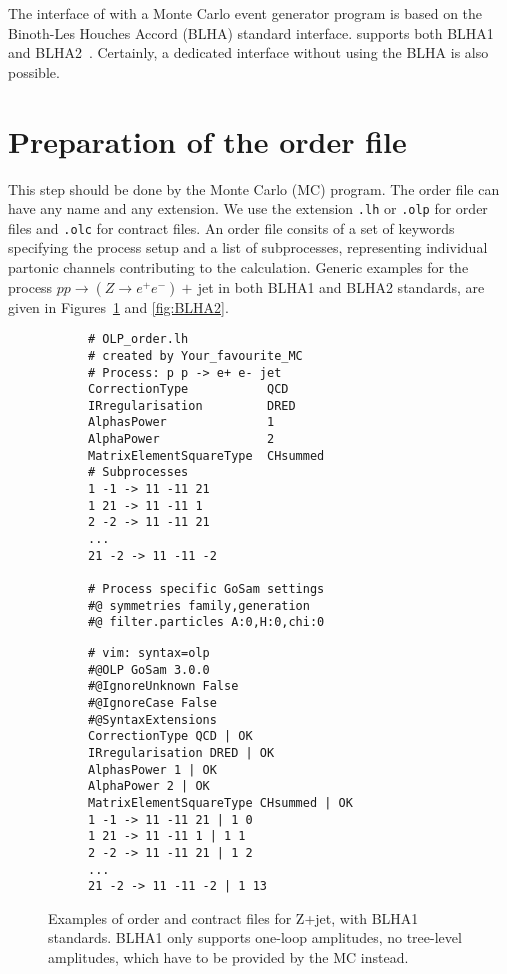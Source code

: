 The interface of \gosam with a Monte Carlo event generator program is based on the Binoth-Les Houches Accord (BLHA) standard interface. \gosamv  supports both BLHA1~\cite{Binoth:2010xt} and BLHA2~\cite{Alioli:2013nda}. Certainly, a dedicated interface without using the BLHA is also possible.

%
%
%
%

\section{Preparation of the order file}
This step should be done by the Monte Carlo (MC) program. The order file can have any name and any extension. We use  the extension \texttt{.lh} or \texttt{.olp} for order files and \texttt{.olc} for contract files. An order file consits of a set of keywords specifying the process setup and a list of subprocesses, representing individual partonic channels contributing to the calculation. Generic examples for the process $pp\to (Z\to e^+e^-)+$\,jet in both BLHA1 and BLHA2 standards, are given in Figures~\ref{fig:BLHA1} and \ref{fig:BLHA2}.

\begin{figure}
\centering
\begin{subfigure}[]{0.49\textwidth}
\centering
\begin{lstlisting}[title={BLHA1 order file},gobble=0,style=insmall,keepspaces=true,frame=single]
# OLP_order.lh
# created by Your_favourite_MC
# Process: p p -> e+ e- jet
CorrectionType           QCD
IRregularisation         DRED
AlphasPower              1
AlphaPower               2
MatrixElementSquareType  CHsummed
# Subprocesses
1 -1 -> 11 -11 21
1 21 -> 11 -11 1
2 -2 -> 11 -11 21
...
21 -2 -> 11 -11 -2

# Process specific GoSam settings
#@ symmetries family,generation
#@ filter.particles A:0,H:0,chi:0
\end{lstlisting}
\end{subfigure}
\hspace*{5pt}
\begin{subfigure}[]{0.46\textwidth}
\centering
\begin{lstlisting}[title={BLHA1 contract file},gobble=0,style=insmall,keepspaces=true,frame=single]
# vim: syntax=olp
#@OLP GoSam 3.0.0
#@IgnoreUnknown False
#@IgnoreCase False
#@SyntaxExtensions
CorrectionType QCD | OK
IRregularisation DRED | OK
AlphasPower 1 | OK
AlphaPower 2 | OK
MatrixElementSquareType CHsummed | OK
1 -1 -> 11 -11 21 | 1 0
1 21 -> 11 -11 1 | 1 1
2 -2 -> 11 -11 21 | 1 2
...
21 -2 -> 11 -11 -2 | 1 13
\end{lstlisting}
\end{subfigure}
\caption{Examples of order and contract files for Z+jet, with BLHA1 standards. BLHA1 only supports one-loop amplitudes, no tree-level amplitudes, which have to be provided by the MC instead.}
\label{fig:BLHA1}
\end{figure}  

